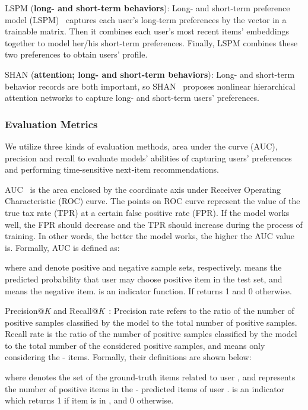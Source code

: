 \documentclass[preprint,12pt]{elsarticle}
\begin{document}
\begin{sloppypar}
LSPM (\textbf{long- and short-term behaviors}): Long- and short-term preference model (LSPM)~\cite{lspm} captures each user's long-term preferences by the vector in a trainable matrix. Then it combines each user's most recent  items' embeddings together to model her/his short-term preferences. Finally, LSPM combines these two preferences to obtain users' profile.

SHAN (\textbf{attention; long- and short-term behaviors}): Long- and short-term behavior records are both important, so SHAN~\cite{ying2018sequential} proposes nonlinear hierarchical attention networks to capture long- and short-term users' preferences.

\subsubsection{Evaluation Metrics}
\label{sec_eval}

We utilize three kinds of evaluation methods, area under the curve (AUC), precision and recall to evaluate models' abilities of capturing users' preferences and performing time-sensitive next-item recommendations.

AUC~\cite{zhou2018atrank} is the area enclosed by the coordinate axis under Receiver Operating Characteristic (ROC) curve. The points on ROC curve represent the value of the true tax rate (TPR) at a certain false positive rate (FPR). If the model works well, the FPR should decrease and the TPR should increase during the process of training. In other words, the better the model works, the higher the AUC value is. Formally, AUC is defined as:

where  and  denote positive and negative sample sets, respectively.  means the predicted probability that user  may choose positive item  in the test set, and  means the negative item.  is an indicator function. If   returns 1 and 0 otherwise.

Precision@\emph{K} and Recall@\emph{K}~\cite{huang2018csan}: Precision rate refers to the ratio of the number of positive samples classified by the model to the total number of positive samples. Recall rate is the ratio of the number of positive samples classified by the model to the total number of the considered positive samples, and  means only considering the - items. Formally, their definitions are shown below:


where  denotes the set of the ground-truth items related to user , and  represents the number of positive items in the - predicted items of user .  is an indicator which returns 1 if item  is in , and 0 otherwise.


\end{sloppypar}
\end{document}
